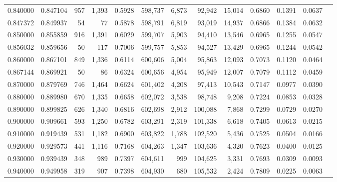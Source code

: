 \begin{tabular}{rrrrrrrrrrrrr}
0.840000 & 0.847104 &    957 & 1,393 &                                     0.5928 & 598,737 &   6,873 &  92,942 &  15,014 & 0.6860 & 0.1391 & 0.0637 \\
0.847372 & 0.849937 &     54 &    77 &                                     0.5878 & 598,791 &   6,819 &  93,019 &  14,937 & 0.6866 & 0.1384 & 0.0632 \\
0.850000 & 0.855859 &    916 & 1,391 &                                     0.6029 & 599,707 &   5,903 &  94,410 &  13,546 & 0.6965 & 0.1255 & 0.0547 \\
0.856032 & 0.859656 &     50 &   117 &                                     0.7006 & 599,757 &   5,853 &  94,527 &  13,429 & 0.6965 & 0.1244 & 0.0542 \\
0.860000 & 0.867101 &    849 & 1,336 &                                     0.6114 & 600,606 &   5,004 &  95,863 &  12,093 & 0.7073 & 0.1120 & 0.0464 \\
0.867144 & 0.869921 &     50 &    86 &                                     0.6324 & 600,656 &   4,954 &  95,949 &  12,007 & 0.7079 & 0.1112 & 0.0459 \\
0.870000 & 0.879769 &    746 & 1,464 &                                     0.6624 & 601,402 &   4,208 &  97,413 &  10,543 & 0.7147 & 0.0977 & 0.0390 \\
0.880000 & 0.889980 &    670 & 1,335 &                                     0.6658 & 602,072 &   3,538 &  98,748 &   9,208 & 0.7224 & 0.0853 & 0.0328 \\
0.890000 & 0.899825 &    626 & 1,340 &                                     0.6816 & 602,698 &   2,912 & 100,088 &   7,868 & 0.7299 & 0.0729 & 0.0270 \\
0.900000 & 0.909661 &    593 & 1,250 &                                     0.6782 & 603,291 &   2,319 & 101,338 &   6,618 & 0.7405 & 0.0613 & 0.0215 \\
0.910000 & 0.919439 &    531 & 1,182 &                                     0.6900 & 603,822 &   1,788 & 102,520 &   5,436 & 0.7525 & 0.0504 & 0.0166 \\
0.920000 & 0.929573 &    441 & 1,116 &                                     0.7168 & 604,263 &   1,347 & 103,636 &   4,320 & 0.7623 & 0.0400 & 0.0125 \\
0.930000 & 0.939439 &    348 &   989 &                                     0.7397 & 604,611 &     999 & 104,625 &   3,331 & 0.7693 & 0.0309 & 0.0093 \\
0.940000 & 0.949958 &    319 &   907 &                                     0.7398 & 604,930 &     680 & 105,532 &   2,424 & 0.7809 & 0.0225 & 0.0063 \\

\end{tabular}
